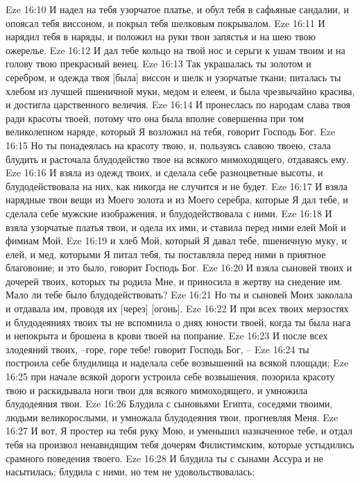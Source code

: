 Eze 16:10  И надел на тебя узорчатое платье, и обул тебя в сафьяные сандалии, и опоясал тебя виссоном, и покрыл тебя шелковым покрывалом.
Eze 16:11  И нарядил тебя в наряды, и положил на руки твои запястья и на шею твою ожерелье.
Eze 16:12  И дал тебе кольцо на твой нос и серьги к ушам твоим и на голову твою прекрасный венец.
Eze 16:13  Так украшалась ты золотом и серебром, и одежда твоя [была] виссон и шелк и узорчатые ткани; питалась ты хлебом из лучшей пшеничной муки, медом и елеем, и была чрезвычайно красива, и достигла царственного величия.
Eze 16:14  И пронеслась по народам слава твоя ради красоты твоей, потому что она была вполне совершенна при том великолепном наряде, который Я возложил на тебя, говорит Господь Бог.
Eze 16:15  Но ты понадеялась на красоту твою, и, пользуясь славою твоею, стала блудить и расточала блудодейство твое на всякого мимоходящего, отдаваясь ему.
Eze 16:16  И взяла из одежд твоих, и сделала себе разноцветные высоты, и блудодействовала на них, как никогда не случится и не будет.
Eze 16:17  И взяла нарядные твои вещи из Моего золота и из Моего серебра, которые Я дал тебе, и сделала себе мужские изображения, и блудодействовала с ними.
Eze 16:18  И взяла узорчатые платья твои, и одела их ими, и ставила перед ними елей Мой и фимиам Мой,
Eze 16:19  и хлеб Мой, который Я давал тебе, пшеничную муку, и елей, и мед, которыми Я питал тебя, ты поставляла перед ними в приятное благовоние; и это было, говорит Господь Бог.
Eze 16:20  И взяла сыновей твоих и дочерей твоих, которых ты родила Мне, и приносила в жертву на снедение им. Мало ли тебе было блудодействовать?
Eze 16:21  Но ты и сыновей Моих заколала и отдавала им, проводя их [через] [огонь].
Eze 16:22  И при всех твоих мерзостях и блудодеяниях твоих ты не вспомнила о днях юности твоей, когда ты была нага и непокрыта и брошена в крови твоей на попрание.
Eze 16:23  И после всех злодеяний твоих, --горе, горе тебе! говорит Господь Бог, --
Eze 16:24  ты построила себе блудилища и наделала себе возвышений на всякой площади;
Eze 16:25  при начале всякой дороги устроила себе возвышения, позорила красоту твою и раскидывала ноги твои для всякого мимоходящего, и умножила блудодеяния твои.
Eze 16:26  Блудила с сыновьями Египта, соседями твоими, людьми великорослыми, и умножала блудодеяния твои, прогневляя Меня.
Eze 16:27  И вот, Я простер на тебя руку Мою, и уменьшил назначенное тебе, и отдал тебя на произвол ненавидящим тебя дочерям Филистимским, которые устыдились срамного поведения твоего.
Eze 16:28  И блудила ты с сынами Ассура и не насытилась; блудила с ними, но тем не удовольствовалась;
